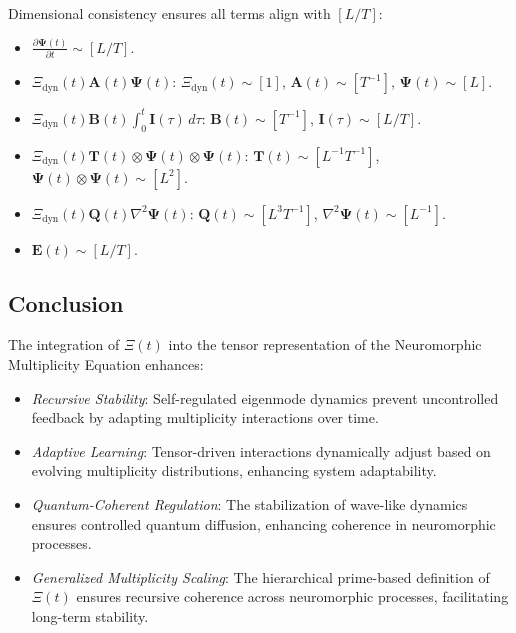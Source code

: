 \documentclass{article}
\theoremstyle{plain}
\begin{document}
\begin{itemize}
Dimensional consistency ensures all terms align with \( [L/T] \):

\begin{itemize}
    \item \( \frac{\partial \bm{\Psi}(t)}{\partial t} \sim [L/T] \).
    \item \( \Xi_{\text{dyn}}(t) \bm{A}(t) \bm{\Psi}(t) \): \( \Xi_{\text{dyn}}(t) \sim [1] \), \( \bm{A}(t) \sim [T^{-1}] \), \( \bm{\Psi}(t) \sim [L] \).
    \item \( \Xi_{\text{dyn}}(t) \bm{B}(t) \int_0^t \bm{I}(\tau) \, d\tau \): \( \bm{B}(t) \sim [T^{-1}] \), \( \bm{I}(\tau) \sim [L/T] \).
    \item \( \Xi_{\text{dyn}}(t) \bm{T}(t) \otimes \bm{\Psi}(t) \otimes \bm{\Psi}(t) \): \( \bm{T}(t) \sim [L^{-1} T^{-1}] \), \( \bm{\Psi}(t) \otimes \bm{\Psi}(t) \sim [L^2] \).
    \item \( \Xi_{\text{dyn}}(t) \bm{Q}(t) \nabla^2 \bm{\Psi}(t) \): \( \bm{Q}(t) \sim [L^3 T^{-1}] \), \( \nabla^2 \bm{\Psi}(t) \sim [L^{-1}] \).
    \item \( \bm{E}(t) \sim [L/T] \).
\end{itemize}

\subsection{Conclusion}

The integration of \(\Xi(t) \) into the tensor representation of the Neuromorphic Multiplicity Equation enhances:

\begin{itemize}
    \item \textit{Recursive Stability}: Self-regulated eigenmode dynamics prevent uncontrolled feedback by adapting multiplicity interactions over time.
    \item \textit{Adaptive Learning}: Tensor-driven interactions dynamically adjust based on evolving multiplicity distributions, enhancing system adaptability.
    \item \textit{Quantum-Coherent Regulation}: The stabilization of wave-like dynamics ensures controlled quantum diffusion, enhancing coherence in neuromorphic processes.
    \item \textit{Generalized Multiplicity Scaling}: The hierarchical prime-based definition of \(\Xi(t) \) ensures recursive coherence across neuromorphic processes, facilitating long-term stability.
\end{itemize}


\end{itemize}
\end{document}

